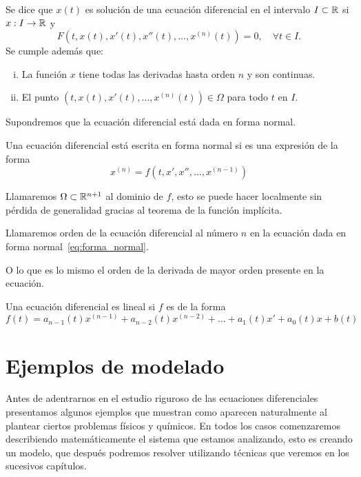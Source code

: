 \documentclass[../ecuaciones_diferenciales.tex]{subfiles}
\begin{document}
\begin{definition}
	Se dice que \(x(t)\) es solución de una ecuación diferencial en el intervalo
	\(I \subset \mathbb{R}\) si \(x : I \to \mathbb{R}\) y
	\[F(t, x(t), x'(t), x''(t), \dots, x^{(n)}(t)) = 0, \quad \forall t \in I.\]
	Se cumple además que:
	\begin{enumerate}[i)]
		\item La función \(x\) tiene todas las derivadas hasta orden \(n\) y son
		      continuas.

		\item El punto \((t, x(t), x'(t), \dots, x^{(n)}(t)) \in \Omega\) para
		      todo \(t\) en \(I\).
	\end{enumerate}
\end{definition}

Supondremos que la ecuación diferencial está dada en forma normal.

\begin{definition}
	Una ecuación diferencial está escrita en forma normal si es una expresión 
	de la forma
	\begin{equation} \label{eq:forma_normal}
		x^{(n)} = f(t, x', x'', \dots, x^{(n - 1)})
	\end{equation}
\end{definition}

Llamaremos \(\Omega \subset \mathbb{R}^{n + 1}\) al dominio de \(f\), esto se puede 
hacer localmente sin pérdida de generalidad gracias al teorema de la función
implícita.

\begin{definition}[Orden]
	Llamaremos orden de la ecuación diferencial al número \(n\) en
	la ecuación dada en forma normal~\ref{eq:forma_normal}.
\end{definition}

O lo que es lo mismo el orden de la derivada de mayor orden presente en la
ecuación.

\begin{definition}
	Una ecuación diferencial es lineal si \(f\) es de la forma
	\[f(t) = a_{n - 1}(t)x^{(n - 1)} + a_{n - 2}(t)x^{(n - 2)} +
		\dots + a_1(t)x' + a_0(t)x + b(t)\]
\end{definition}

\section{Ejemplos de modelado}

Antes de adentrarnos en el estudio riguroso de las ecuaciones diferenciales
presentamos algunos ejemplos que muestran como aparecen naturalmente al plantear
ciertos problemas físicos y químicos. En todos los casos comenzaremos
describiendo matemáticamente el sistema que estamos analizando, esto es creando
un modelo, que después podremos resolver utilizando técnicas que veremos en los
sucesivos capítulos.
\end{document}

